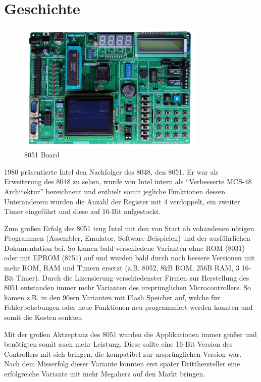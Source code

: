
\chapter{Geschichte}\label{geschichte}

\begin{figure}[htbp]
\centering
\includegraphics[width=0.8\textwidth]{images/8051-board}
\caption{8051 Board\footnotemark}
\end{figure}

1980 präsentierte Intel den Nachfolger des 8048, den 8051. Er war als
Erweiterung des 8048 zu sehen, wurde von Intel intern als ``Verbesserte
MCS-48 Architektur'' bezeichnent und enthielt somit jegliche Funktionen
dessen. Unteranderem wurden die Anzahl der Register mit 4 verdoppelt,
ein zweiter Timer eingeführt und diese auf 16-Bit aufgestockt.

Zum großen Erfolg des 8051 trug Intel mit den von Start ab vohandenen
nötigen Programmen (Assembler, Emulator, Software Beispielen) und der
ausführlichen Dokumentation bei. So kamen bald verschiedene Varianten
ohne \ac{ROM} (8031) oder mit \ac{EPROM} (8751) auf und wurden bald
durch noch bessere Versionen mit mehr \ac{ROM}, \ac{RAM} und Timern
ersetzt (z.B. 8052, 8kB \ac{ROM}, 256B \ac{RAM}, 3 16-Bit Timer). Durch
die Lizensierung verschiedenster Firmen zur Herstellung des 8051
entstanden immer mehr Varianten des ursprünglichen Microcontrollers. So
kamen z.B. in den 90ern Varianten mit Flash Speicher auf, welche für
Fehlerbehebungen oder neue Funktionen neu programmiert werden konnten
und somit die Kosten senkten

Mit der großen Aktzeptanz des 8051 wurden die Applikationen immer größer
und benötigten somit auch mehr Leistung. Diese sollte eine 16-Bit
Version des Controllers mit sich bringen, die kompatibel zur
ursprünglichen Version war. Nach dem Misserfolg dieser Variante konnten
erst später Dritthersteller eine erfolgreiche Variante mit mehr Megaherz
auf den Markt bringen.
